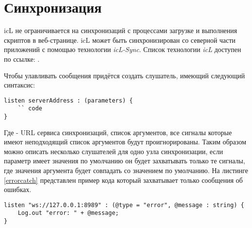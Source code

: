 \section{Синхронизация}

icL не ограничивается на синхронизаций с процессами загрузке и выполнения скриптов в веб-странице. icL может быть синхронизирован со северной части приложений с помощью технологии \textit{icL-Sync}. Список технологии \textit{icL} доступен по ссылке: .

Чтобы улавливать сообщения придётся создать слушатель, имеющий следующий синтаксис:
\begin{lstlisting}
listen serverAddress : (parameters) {
	`` code
}
\end{lstlisting}

Где  - URL сервиса синхронизаций,  список аргументов, все сигналы которые имеют неподходящий список аргументов будут проигнорированы. Таким образом можно описать несколько слушателей для одно узла синхронизации, если параметр имеет значения по умолчанию он будет захватывать только те сигналы, где значения аргумента будет совпадать со значением по умолчанию. На листинге \ref{errorcatch} представлен пример кода который захватывает только сообщения об ошибках.


\begin{lstlisting}[caption=Захват ошибок, label=errorcatch]
listen "ws://127.0.0.1:8989" : (@type = "error", @message : string) {
	Log.out "error: " + @message;
}
\end{lstlisting}